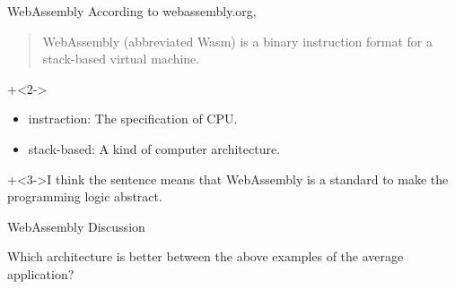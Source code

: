 \begin{frame}{WebAssembly}{}
    According to webassembly.org,
    \begin{quote}WebAssembly (abbreviated Wasm) is a binary instruction format for a stack-based virtual machine.\end{quote}
    \vspace{2ex}

    \onslide+<2->{
        \begin{itemize}
            \item   instraction:    The specification of CPU.
            \item   stack-based:    A kind of computer architecture.
        \end{itemize}
    }
    \vspace{2ex}

    \onslide+<3->{I think the sentence means that WebAssembly is a standard to make the programming logic abstract.}
\end{frame}


\begin{frame}{WebAssembly}{}
    Discussion
    \vspace{4ex}

    Which architecture is better between the above examples of the average application?
\end{frame}

